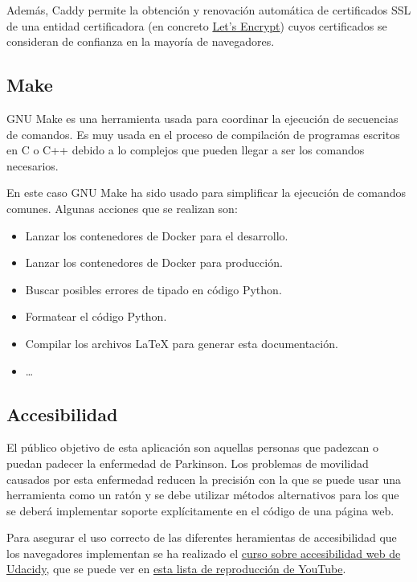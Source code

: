 Además, Caddy permite la obtención y renovación automática de certificados SSL
de una entidad certificadora (en concreto \href{https://letsencrypt.org/}{Let's
Encrypt}) cuyos certificados se consideran de confianza en la mayoría de
navegadores.

\subsection{Make}

GNU Make es una herramienta usada para coordinar la ejecución de secuencias de
comandos. Es muy usada en el proceso de compilación de programas escritos en C o
C++ debido a lo complejos que pueden llegar a ser los comandos necesarios.

En este caso GNU Make ha sido usado para simplificar la ejecución de comandos
comunes. Algunas acciones que se realizan son:

\begin{itemize}
    \item Lanzar los contenedores de Docker para el desarrollo.
    \item Lanzar los contenedores de Docker para producción.
    \item Buscar posibles errores de tipado en código Python.
    \item Formatear el código Python.
    \item Compilar los archivos \LaTeX{} para generar esta documentación.
    \item \dots
\end{itemize}

\subsection{Accesibilidad}

El público objetivo de esta aplicación son aquellas personas que padezcan o
puedan padecer la enfermedad de Parkinson. Los problemas de movilidad causados
por esta enfermedad reducen la precisión con la que se puede usar una
herramienta como un ratón y se debe utilizar métodos alternativos para los que
se deberá implementar soporte explícitamente en el código de una página web.

Para asegurar el uso correcto de las diferentes heramientas de accesibilidad que
los navegadores implementan se ha realizado el
\href{https://www.udacity.com/course/web-accessibility--ud891}{curso sobre
accesibilidad web de Udacidy}, que se puede ver en
\href{https://www.youtube.com/playlist?list=PLcJAkgdenpsci0IJziU4bCk3dTQLpJU7R}{esta
lista de reproducción de YouTube}.

